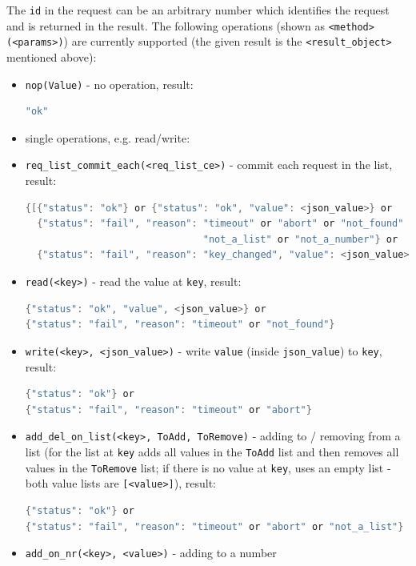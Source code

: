 \documentclass[a4paper]{scrreprt}
\newcommand{\code}[1]{\lstinline[basicstyle=\ttfamily]!#1!}
\begin{document}
The \code{id} in the request can be an arbitrary number which identifies the
request and is returned in the result.
The following operations (shown as \code{<method>(<params>)}) are currently
supported (the given result is the \code{<result_object>} mentioned above):
\begin{itemize}
  \item \code{nop(Value)} - no operation, result:
\begin{lstlisting}[language=java]
"ok"
\end{lstlisting}
  \item[] \hspace{-1.7em}single operations, e.g. read/write:
  \item \code{req_list_commit_each(<req_list_ce>)} - commit each request in the list, result:
\begin{lstlisting}[language=java]
{[{"status": "ok"} or {"status": "ok", "value": <json_value>} or
  {"status": "fail", "reason": "timeout" or "abort" or "not_found" or
                               "not_a_list" or "not_a_number"} or
  {"status": "fail", "reason": "key_changed", "value": <json_value>}]}
\end{lstlisting}
  \item \code{read(<key>)} - read the value at \code{key}, result:
\begin{lstlisting}[language=java]
{"status": "ok", "value", <json_value>} or
{"status": "fail", "reason": "timeout" or "not_found"}
\end{lstlisting}
  \item \code{write(<key>, <json_value>)} - write \code{value} (inside \code{json_value}) to \code{key}, result:
\begin{lstlisting}[language=java]
{"status": "ok"} or
{"status": "fail", "reason": "timeout" or "abort"}
\end{lstlisting}
  \item \code{add_del_on_list(<key>, ToAdd, ToRemove)} - adding to / removing from a list
  (for the list at \code{key} adds all values in the \code{ToAdd} list and
  then removes all values in the \code{ToRemove} list; if there is no value at
  \code{key}, uses an empty list - both value lists are \code{[<value>]}), result:
\begin{lstlisting}[language=java]
{"status": "ok"} or
{"status": "fail", "reason": "timeout" or "abort" or "not_a_list"}
\end{lstlisting}
  \item \code{add_on_nr(<key>, <value>)} - adding to a number

\end{itemize}
\end{document}
